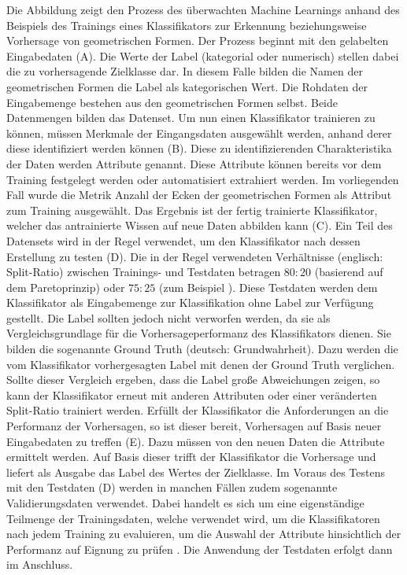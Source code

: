 Die Abbildung zeigt den Prozess des überwachten Machine Learnings anhand des Beispiels des Trainings eines Klassifikators zur Erkennung beziehungsweise Vorhersage von geometrischen Formen. Der Prozess beginnt mit den \glqq gelabelten\grqq{} Eingabedaten (A). Die Werte der Label (kategorial oder numerisch) stellen dabei die zu vorhersagende Zielklasse dar. In diesem Falle bilden die Namen der geometrischen Formen die Label als kategorischen Wert. Die Rohdaten der Eingabemenge bestehen aus den geometrischen Formen selbst. Beide Datenmengen bilden das Datenset. Um nun einen Klassifikator trainieren zu können, müssen Merkmale der Eingangsdaten ausgewählt werden, anhand derer diese identifiziert werden können (B). Diese zu identifizierenden Charakteristika der Daten werden Attribute genannt. Diese Attribute können bereits vor dem Training festgelegt werden oder automatisiert extrahiert werden. Im vorliegenden Fall wurde die Metrik \glqq Anzahl der Ecken der geometrischen Formen\grqq{} als Attribut zum Training ausgewählt. Das Ergebnis ist der fertig trainierte Klassifikator, welcher das antrainierte Wissen auf neue Daten abbilden kann (C). Ein Teil des Datensets wird in der Regel verwendet, um den Klassifikator nach dessen Erstellung zu testen (D). Die in der Regel verwendeten Verhältnisse (englisch: Split-Ratio) zwischen Trainings- und Testdaten betragen $80:20$ (basierend auf dem Paretoprinzip) oder $75:25$ (zum Beispiel \cite{Queiroz2016}). Diese Testdaten werden dem Klassifikator als Eingabemenge zur Klassifikation ohne Label zur Verfügung gestellt. Die Label sollten jedoch nicht verworfen werden, da sie als Vergleichsgrundlage für die Vorhersageperformanz des Klassifikators dienen. Sie bilden die sogenannte \glqq Ground Truth\grqq{} (deutsch: Grundwahrheit). Dazu werden die vom Klassifikator vorhergesagten Label mit denen der Ground Truth verglichen. Sollte dieser Vergleich ergeben, dass die Label große Abweichungen zeigen, so kann der Klassifikator erneut mit anderen Attributen oder einer veränderten Split-Ratio trainiert werden. Erfüllt der Klassifikator die Anforderungen an die Performanz der Vorhersagen, so ist dieser bereit, Vorhersagen auf Basis neuer Eingabedaten zu treffen (E). Dazu müssen von den neuen Daten die Attribute ermittelt werden. Auf Basis dieser trifft der Klassifikator die Vorhersage und liefert als Ausgabe das Label des Wertes der Zielklasse. Im Voraus des Testens mit den Testdaten (D) werden in manchen Fällen zudem sogenannte Validierungsdaten verwendet. Dabei handelt es sich um eine eigenständige Teilmenge der Trainingsdaten, welche verwendet wird, um die Klassifikatoren nach jedem Training zu evaluieren, um die Auswahl der Attribute hinsichtlich der Performanz auf Eignung zu prüfen \cite{Sammut2017}. Die Anwendung der Testdaten erfolgt dann im Anschluss.

